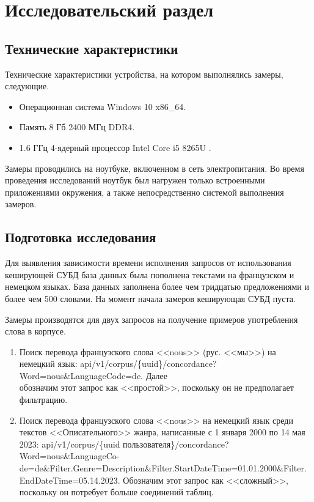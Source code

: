 \section{Исследовательский раздел}

\subsection{Технические характеристики}

Технические характеристики устройства, на котором выполнялись замеры, следующие.

\begin{itemize}[label=---]
	\item Операционная система Windows 10 \cite{oswind} x86\_64.
	\item Память 8 Гб 2400 МГц DDR4.
	\item 1.6 ГГц 4-ядерный процессор Intel Core i5 8265U \cite{intel}.
\end{itemize}

Замеры проводились на ноутбуке, включенном в сеть электропитания. Во время проведения исследований ноутбук был нагружен только встроенными приложениями окружения, а также непосредственно системой выполнения замеров.

\subsection{Подготовка исследования}

Для выявления зависимости времени исполнения запросов от использования кеширующей СУБД база данных была пополнена текстами на французском и немецком языках.
База данных заполнена более чем тридцатью предложениями и более чем 500 словами. 
На момент начала замеров кеширующая СУБД пуста.

Замеры производятся для двух запросов на получение примеров употребления слова в корпусе.
\begin{enumerate}
	\item Поиск перевода французского слова <<nous>> (рус. <<мы>>) на немецкий язык: api/v1/corpus/\{uuid\}/concordance?Word=nous\&LanguageCode=de. 
	Далее \\обозначим этот запрос как <<простой>>, поскольку он не предполагает фильтрацию.
	
	\item  Поиск перевода французского слова <<nous>> на немецкий язык среди текстов <<Описательного>> жанра, написанные с 1 января 2000 по 14 мая 2023: api/v1/corpus/\{uuid пользователя\}/concordance?Word=nous\&LanguageCo-de=de\&Filter.Genre=Description\&Filter.StartDateTime=01.01.2000\&Filter.\\EndDateTime=05.14.2023. 
	Обозначим этот запрос как <<сложный>>, поскольку он потребует больше соединений таблиц.
\end{enumerate}

